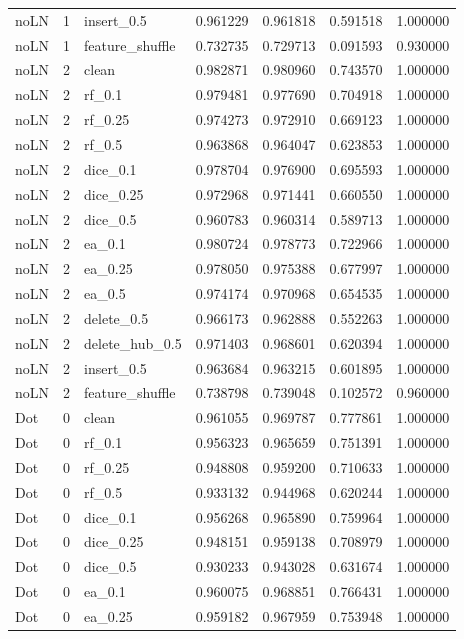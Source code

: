 \documentclass[UTF8,a4paper,11pt,fontset=fandol]{ctexart}
\begin{document}
{\begin{longtable}{lrlrrrr}
noLN & 1 & insert\_0.5 & 0.961229 & 0.961818 & 0.591518 & 1.000000 \\
noLN & 1 & feature\_shuffle & 0.732735 & 0.729713 & 0.091593 & 0.930000 \\
noLN & 2 & clean & 0.982871 & 0.980960 & 0.743570 & 1.000000 \\
noLN & 2 & rf\_0.1 & 0.979481 & 0.977690 & 0.704918 & 1.000000 \\
noLN & 2 & rf\_0.25 & 0.974273 & 0.972910 & 0.669123 & 1.000000 \\
noLN & 2 & rf\_0.5 & 0.963868 & 0.964047 & 0.623853 & 1.000000 \\
noLN & 2 & dice\_0.1 & 0.978704 & 0.976900 & 0.695593 & 1.000000 \\
noLN & 2 & dice\_0.25 & 0.972968 & 0.971441 & 0.660550 & 1.000000 \\
noLN & 2 & dice\_0.5 & 0.960783 & 0.960314 & 0.589713 & 1.000000 \\
noLN & 2 & ea\_0.1 & 0.980724 & 0.978773 & 0.722966 & 1.000000 \\
noLN & 2 & ea\_0.25 & 0.978050 & 0.975388 & 0.677997 & 1.000000 \\
noLN & 2 & ea\_0.5 & 0.974174 & 0.970968 & 0.654535 & 1.000000 \\
noLN & 2 & delete\_0.5 & 0.966173 & 0.962888 & 0.552263 & 1.000000 \\
noLN & 2 & delete\_hub\_0.5 & 0.971403 & 0.968601 & 0.620394 & 1.000000 \\
noLN & 2 & insert\_0.5 & 0.963684 & 0.963215 & 0.601895 & 1.000000 \\
noLN & 2 & feature\_shuffle & 0.738798 & 0.739048 & 0.102572 & 0.960000 \\
Dot & 0 & clean & 0.961055 & 0.969787 & 0.777861 & 1.000000 \\
Dot & 0 & rf\_0.1 & 0.956323 & 0.965659 & 0.751391 & 1.000000 \\
Dot & 0 & rf\_0.25 & 0.948808 & 0.959200 & 0.710633 & 1.000000 \\
Dot & 0 & rf\_0.5 & 0.933132 & 0.944968 & 0.620244 & 1.000000 \\
Dot & 0 & dice\_0.1 & 0.956268 & 0.965890 & 0.759964 & 1.000000 \\
Dot & 0 & dice\_0.25 & 0.948151 & 0.959138 & 0.708979 & 1.000000 \\
Dot & 0 & dice\_0.5 & 0.930233 & 0.943028 & 0.631674 & 1.000000 \\
Dot & 0 & ea\_0.1 & 0.960075 & 0.968851 & 0.766431 & 1.000000 \\
Dot & 0 & ea\_0.25 & 0.959182 & 0.967959 & 0.753948 & 1.000000 \\

\end{longtable}}
\end{document}
